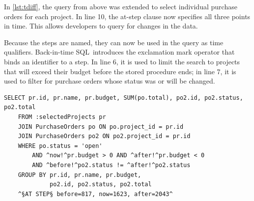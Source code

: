 \documentclass[english,conference,final]{IEEEtran}
\newcommand{\SQLextension}{Back-in-time SQL}
\begin{document}
In \cref{lst:tdiff}, the query from above was extended to select individual purchase orders for each project.
In line 10, the at-step clause now specifies all three points in time.
This allows developers to query for changes in the data.

Because the steps are named, they can now be used in the query as time qualifiers.
\SQLextension\ introduces the exclamation mark operator that binds an identifier to a step.
In line 6, it is used to limit the search to projects that will exceed their budget before the stored procedure ends;
in line 7, it is used to filter for purchase orders whose status was or will be changed.

\begin{lstlisting}[language=HanaSQL,float=t,caption={Example of a time-diff query: "Select all projects that will go over budget and their respective purchase orders"},label=lst:tdiff]
	SELECT pr.id, pr.name, pr.budget, SUM(po.total), po2.id, po2.status, po2.total
	FROM :selectedProjects pr
	JOIN PurchaseOrders po ON po.project_id = pr.id
	JOIN PurchaseOrders po2 ON po2.project_id = pr.id
	WHERE po.status = 'open'
		AND ^now!^pr.budget > 0 AND ^after!^pr.budget < 0
		AND ^before!^po2.status != ^after!^po2.status
	GROUP BY pr.id, pr.name, pr.budget, 
	         po2.id, po2.status, po2.total
	^§AT STEP§ before=817, now=1623, after=2043^
\end{lstlisting}
\end{document}

